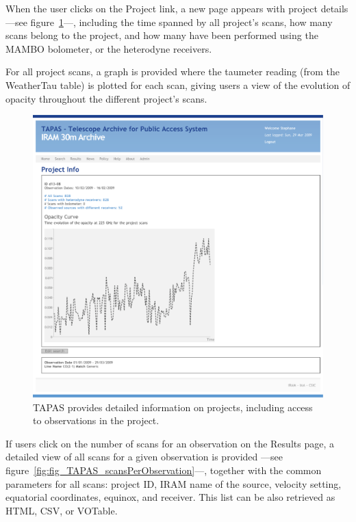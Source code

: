 			When the user clicks on the Project link, a new
			page appears with project details ---see
			figure~\ref{fig:fig_TAPAS_projectDetail}---, including
			the time spanned by all project's scans, how many
			scans belong to the project, and how many have been
			performed using the MAMBO bolometer, or the heterodyne
			receivers.
			
			For all project scans, a graph is provided where the
			taumeter reading (from the WeatherTau table) is plotted
			for each scan, giving users a view of the evolution of
			opacity throughout the different project's scans.
			
			\begin{figure}[tbp]
				\centering
					\includegraphics[width=\textwidth]
					{fig/TAPAS_projectDetail.pdf}
				\caption[TAPAS project detail page]
				{TAPAS provides detailed information on projects,
				including access to observations in the project.}
				\label{fig:fig_TAPAS_projectDetail}
			\end{figure}
			
			If users click on the number of scans for
			an observation on the Results page, a detailed view of
			all scans for a given observation is provided
			---see
			figure~\ref{fig:fig_TAPAS_scansPerObservation}---,
			together with the common parameters for all scans:
			project ID, IRAM name of the source, velocity setting,
			equatorial coordinates, equinox, and receiver. This
			list can be also retrieved as HTML, CSV, or VOTable.
			
